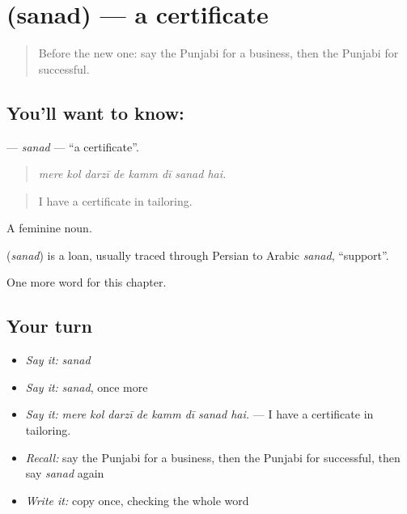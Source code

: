 \section[\texorpdfstring{\pa{ਸਨਦ} (sanad)}{ਸਨਦ (sanad)}]{ (sanad) — a certificate}

\label{lesson:PA-C364-sanad}



\begin{quote}
Before the new one: say the Punjabi for a business, then the Punjabi for successful.
\end{quote}

\subsection*{You'll want to know: }
\textbf{} — \emph{sanad} — \textquotedblleft{}a certificate\textquotedblright{}.

\begin{quote}
       
\end{quote}

\begin{quote}
\emph{mere kol darzī de kamm dī sanad hai.}
\end{quote}

\begin{quote}
I have a certificate in tailoring.
\end{quote}

A feminine noun.

\begin{cousinweb}
\textbf{} (\emph{sanad}) is a loan, usually traced through Persian to Arabic \emph{sanad}, \textquotedblleft{}support\textquotedblright{}.
\end{cousinweb}

\begin{grammarlens}[title={What you've built}]
One more word for this chapter.
\end{grammarlens}

\subsection*{Your turn}
\begin{itemize}
\raggedright
  \item \emph{Say it:} \emph{sanad}
  \item \emph{Say it:} \emph{sanad}, once more
  \item \emph{Say it:} \emph{mere kol darzī de kamm dī sanad hai.} — I have a certificate in tailoring.
  \item \emph{Recall:} say the Punjabi for a business, then the Punjabi for successful, then say \emph{sanad} again
  \item \emph{Write it:} copy \textbf{} once, checking the whole word
\end{itemize}

